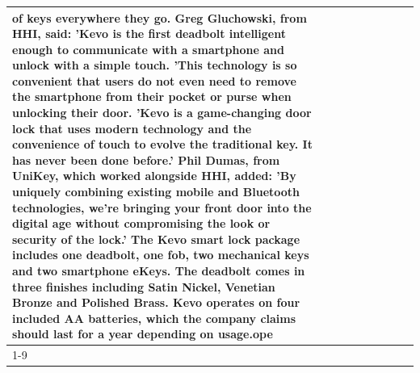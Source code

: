 \begin{table}[H]
\begin{tabular}{lllrlllll}
of keys everywhere they go. Greg Gluchowski, from HHI, said: 'Kevo is the first deadbolt intelligent enough to communicate with a smartphone and unlock with a simple touch. 'This technology is so convenient that users do not even need to remove the smartphone from their pocket or purse when unlocking their door. 'Kevo is a game-changing door lock that uses modern technology and the convenience of touch to evolve the traditional key. It has never been done before.' Phil Dumas, from UniKey, which worked alongside HHI, added: 'By uniquely combining existing mobile and Bluetooth technologies, we’re bringing your front door into the digital age without compromising the look or security of the lock.' The Kevo smart lock package includes one deadbolt, one fob, two mechanical keys and two smartphone eKeys. The deadbolt comes in three finishes including Satin Nickel, Venetian Bronze and Polished Brass. Kevo operates on four included AA batteries, which the company claims should last for a year depending on usage.ope \\
\cline{1-9}

\end{tabular}
\end{table}
